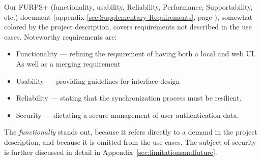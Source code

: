 Our FURPS+ (functionality, usability, Reliability, Performance, Supportability, etc.) document (appendix \ref{sec:Supplementary Requirements}, page \pageref{sec:Supplementary Requirements}), somewhat colored by the project description, covers requirements not described in the use cases. 
Noteworthy requirements are: 
\begin{itemize}
\item Functionality --- refining the requirement of having both a local and web UI. As well as a merging requirement
\item Usability --- providing guidelines for interface design
\item Reliability --- stating that the synchronization process must be resilient.
\item Security --- dictating a secure management of user authentication data.
\end{itemize}
The \emph{functionally} stands out, because it refers directly to a demand in the project description, and because it is omitted from the use cases.
The subject of security is further discussed in detail in Appendix~\ref{sec:limitationsandfuture}.
